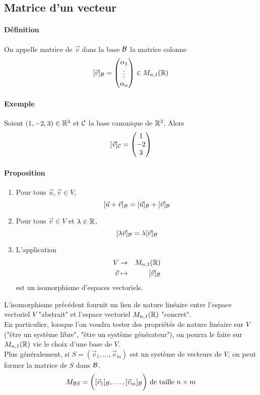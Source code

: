 %
\subsection{Matrice d'un vecteur}
%
\paragraph{Définition} On appelle  matrice de $\vec{v}$ dans la base $\mathcal{B}$ la matrice colonne 
$$[\vec{v}]_{\mathcal{B}} = 
\begin{pmatrix} 
  \alpha_1 \\ 
  \vdots \\ 
  \alpha_n 
\end{pmatrix} 
\in M_{n, 1}(\mathbb{R})$$

\paragraph{Exemple} Soient $(1, -2, 3) \in \mathbb{R}^3$ et $\mathcal{C}$ la base canonique de $\mathbb{R}^3$. Alors
$$[\vec{v}]_{\mathcal{C}} = 
\begin{pmatrix} 
  1 \\ 
  -2 \\ 
  3 
\end{pmatrix}$$

\paragraph{Proposition} 
\begin{enumerate}
  \item Pour tous $\vec{u}, \vec{v} \in V$, 
    $$[\vec{u} + \vec{v}]_{\mathcal{B}} = [\vec{u}]_{\mathcal{B}} + [\vec{v}]_{\mathcal{B}}$$
  \item Pour tous $\vec{v} \in V$ et $\lambda  \in \mathbb{R}$, 
    $$[\lambda \vec{v}]_{\mathcal{B}} = \lambda [\vec{v}]_{\mathcal{B}}$$
  \item L'application
    \begin{eqnarray*}
      V &\rightarrow& M_{n, 1}(\mathbb{R}) \\
      \vec{v} &\mapsto& [\vec{v}]_{\mathcal{B}}
    \end{eqnarray*}
    est un isomorphisme d'espaces vectoriels.
\end{enumerate}
L'isomorphisme précédent fournit un lien de nature linéaire entre l'espace vectoriel $V$ "abstrait" et l'espace vectoriel $M_{n, 1}(\mathbb{R})$ "concret". \\
En particulier, lorsque l'on voudra tester des propriétés de nature linéaire sur $V$ ("être un système libre", "être un système générateur"), on pourra le faire sur $M_{n, 1}(\mathbb{R})$ vie le choix d'une base de $V$. \\
Plus généralement, si $S=(\vec{v}_1, \ldots, \vec{v}_m)$ est un système de vecteurs de $V$, on peut former la matrice de $S$ dans $\mathcal{B}$.
$$M_{\mathcal{B} S} = \bigg( [\vec{v}_1]_{\mathcal{B}}, \ldots, [\vec{v}_m]_{\mathcal{B}} \bigg) \text{ de taille } n \times m$$

